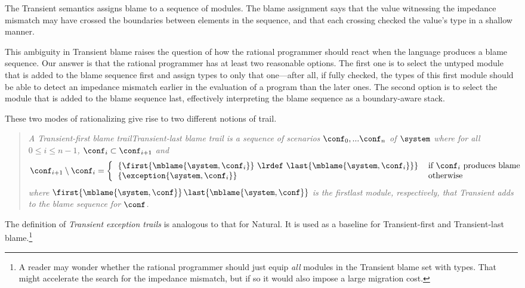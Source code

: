 
The Transient semantics assigns blame to a sequence of modules. The blame
assignment says that the value witnessing the impedance mismatch may have
crossed the boundaries between elements in the sequence, and that each crossing
checked the value's type in a shallow manner.

This ambiguity in Transient blame raises the question of how the rational
programmer should react when the language produces a blame sequence. Our answer
is that the rational programmer has at least two reasonable options. The first
one is to select the untyped module that is added to the blame sequence first and
assign types to only that one---after all, if fully checked, the types of this
first module should be able to detect an impedance mismatch earlier in the
evaluation of a program than the later ones. The second option is to select the
module that is added to the blame sequence last, effectively interpreting the
blame sequence as a boundary-aware stack.

These two modes of rationalizing give rise to two different notions of trail.

\begin{quote}
\it A \emph{Transient-first blame trail}{\lrdef}\emph{Transient-last blame trail} is a sequence of scenarios
$\conf_0,...\conf_n$ of $\system$ where for all $0 \leq i \leq n - 1$,
$\conf_i \subset \conf_{i+1}$ and
\[ \conf_{i+1} \setminus \conf_i = %
\left\{ %
\begin{tabular}{ll} %
$\{\first{\mblame{\system, \conf_i}}$ \lrdef $\last{\mblame{\system, \conf_i}}\}$  & if $\conf_i$ produces blame \\ %
$\{\exception{\system, \conf_i}\}$     & otherwise \\ %
\end{tabular} \right. %
\]
where $\first{\mblame{\system, \conf}}${\lrdef}$\last{\mblame{\system, \conf}}$ is the
first{\lrdef}last module, respectively,  that Transient adds to the blame sequence for $\conf$.
\end{quote}

The definition of \emph{Transient exception trails} is analogous to that for
Natural. It is used as a baseline for Transient-first and Transient-last
blame.\footnote{A reader may wonder whether the rational programmer
should just equip {\em all\/} modules in the Transient blame set
with types. That might accelerate the search for the impedance
mismatch, but if so it would also impose a large migration cost.}
